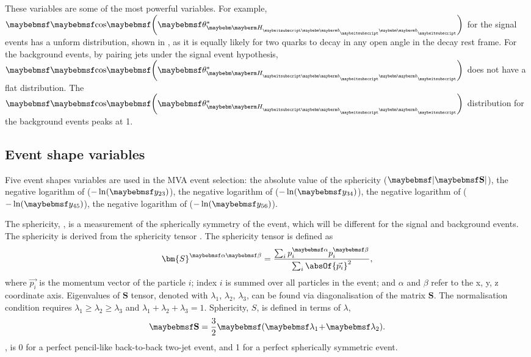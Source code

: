 These variables are some of the most powerful variables. For example, $\cosStar{\Hbb}$ for  the signal events has a unform distribution, shown in , as it is equally likely for two quarks to decay in any open angle in the \Hbb decay rest frame. For the background events, by pairing jets under the signal event hypothesis, $\cosStar{\Hbb}$ does not have a flat distribution. The  $\cosStar{\Hbb}$ distribution for the background events peaks at 1.

\subsection{Event shape variables}

Five event shapes variables are used in the MVA event selection: the absolute value of the sphericity ($\abs{\sphericity}$), the negative logarithm of  ($-\ln(\y{23})$), the negative logarithm of  ($-\ln(\y{34})$), the negative logarithm of  ($-\ln(\y{45})$), the negative logarithm of  ($-\ln(\y{56})$).

The sphericity, \sphericity, is a measurement of the spherically symmetry of the event, which will be different for the signal and background events. The sphericity is  derived from the sphericity tensor \cite{PhysRevLett.35.1609}. The sphericity tensor is  defined as
\begin{equation}
{\bm{S}^{\alpha\beta}} = \frac{\sum_{i}p^{\alpha}_{i}p^{\beta}_{i}}{\sum_{i}\absOf{\vec{p_{i}}}^2},
\end{equation}
where $\vec{p_{i}}$ is the momentum vector of the particle $i$; index $i$ is summed over all particles in the event; and $\alpha$ and $\beta$ refer to the x, y, z coordinate axis. Eigenvalues of $\bm{S}$  tensor, denoted with $\lambda_{1}$, $\lambda_{2}$, $\lambda_{3}$, can be found via diagonalisation of the matrix $\bm{S}$. The normalisation condition requires $\lambda_{1}\!\geqslant\! \lambda_{2} \! \geqslant \! \lambda_{3}$ and $ \lambda_{1} \! + \! \lambda_{2} \! + \! \lambda_{3} \! = \! 1 $. Sphericity, $S$, is defined in terms of $\lambda$,
\begin{equation}
\sphericity = \frac{3}{2}\parenths{\lambda_{1} \! + \! \lambda_{2}}.
\end{equation}
\sphericity, is 0 for a perfect pencil-like back-to-back two-jet event, and 1 for a perfect spherically symmetric event.


